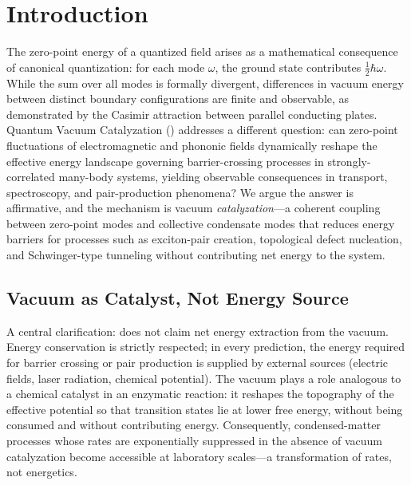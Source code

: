 \documentclass[11pt,letterpaper]{article}
\begin{document}
\section{Introduction}

The zero-point energy of a quantized field arises as a mathematical consequence of canonical quantization: for each mode $\omega$, the ground state contributes $\frac{1}{2}\hbar\omega$. While the sum over all modes is formally divergent, differences in vacuum energy between distinct boundary configurations are finite and observable, as demonstrated by the Casimir attraction between parallel conducting plates\cite{Casimir1948,Lamoreaux1997}. Quantum Vacuum Catalyzation (\QVC) addresses a different question: can zero-point fluctuations of electromagnetic and phononic fields dynamically reshape the effective energy landscape governing barrier-crossing processes in strongly-correlated many-body systems, yielding observable consequences in transport, spectroscopy, and pair-production phenomena? We argue the answer is affirmative, and the mechanism is vacuum \textit{catalyzation}—a coherent coupling between zero-point modes and collective condensate modes that reduces energy barriers for processes such as exciton-pair creation, topological defect nucleation, and Schwinger-type tunneling without contributing net energy to the system.

\subsection{Vacuum as Catalyst, Not Energy Source}

A central clarification: \QVC{} does not claim net energy extraction from the vacuum. Energy conservation is strictly respected; in every prediction, the energy required for barrier crossing or pair production is supplied by external sources (electric fields, laser radiation, chemical potential). The vacuum plays a role analogous to a chemical catalyst in an enzymatic reaction: it reshapes the topography of the effective potential so that transition states lie at lower free energy, without being consumed and without contributing energy. Consequently, condensed-matter processes whose rates are exponentially suppressed in the absence of vacuum catalyzation become accessible at laboratory scales—a transformation of rates, not energetics.
\end{document}
